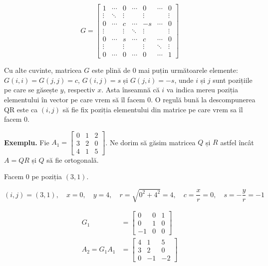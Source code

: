 \documentclass{exam}
\begin{document}
\begin{equation*}
	G =
	\begin{bmatrix}   1      & \cdots & 0      & \cdots & 0      & \cdots & 0      \\
                  \vdots & \ddots & \vdots &        & \vdots &        & \vdots \\
                  0      & \cdots & c      & \cdots & -s     & \cdots & 0      \\
                  \vdots &        & \vdots & \ddots & \vdots &        & \vdots \\
                  0      & \cdots & s      & \cdots & c      & \cdots & 0      \\
                  \vdots &        & \vdots &        & \vdots & \ddots & \vdots \\
                  0      & \cdots & 0      & \cdots & 0      & \cdots & 1
	\end{bmatrix}
\end{equation*}

\par Cu alte cuvinte, matricea $G$ este plină de 0 mai puțin următoarele
elemente: $G(i, i) = G(j, j) = c$, $G(i, j) = s$ și $G(j, i) = -s$, unde $i$
și $j$ sunt pozițiile pe care se găsește $y$, respectiv $x$. Asta înseamnă că $i$
va indica mereu poziția elementului în vector pe care vrem să îl facem 0.
O regulă bună la descompunerea QR este ca $(i, j)$ să fie fix poziția
elementului din matrice pe care vrem sa îl facem 0.

\par \textbf{Exemplu.} Fie $A_1 = \begin{bmatrix}
		0 & 1 & 2 \\
		3 & 2 & 0 \\
		4 & 1 & 5
	\end{bmatrix}$. Ne dorim să găsim matricea $Q$ și $R$ astfel încât $A = QR$ și $Q$ să fie ortogonală.

\par Facem 0 pe poziția $(3, 1)$.

\begin{equation*}
	(i, j) = (3, 1), \quad x = 0, \quad y = 4, \quad r = \sqrt{0^2 + 4^2} = 4, \quad c = \frac{x}{r} = 0, \quad s = -\frac{y}{r} = -1
\end{equation*}

\begin{align*}
	G_1           & = \begin{bmatrix}
		                  0  & 0 & 1 \\
		                  0  & 1 & 0 \\
		                  -1 & 0 & 0
	                  \end{bmatrix} \\
	A_2 = G_1 A_1 & = \begin{bmatrix}
		                  4 & 1  & 5  \\
		                  3 & 2  & 0  \\
		                  0 & -1 & -2
	                  \end{bmatrix}
\end{align*}
\end{document}
